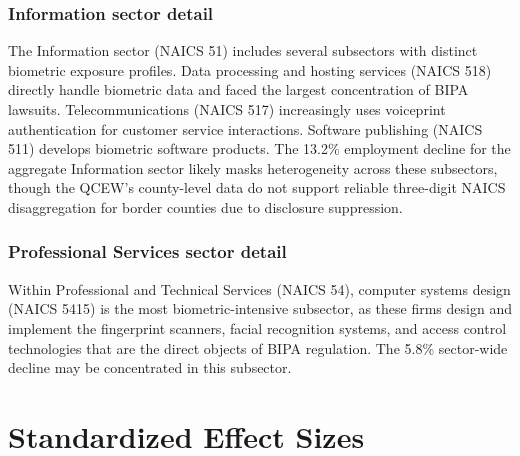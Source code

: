 \documentclass[12pt]{article}
\begin{document}
\subsubsection*{Information sector detail} The Information sector (NAICS 51) includes several subsectors with distinct biometric exposure profiles. Data processing and hosting services (NAICS 518) directly handle biometric data and faced the largest concentration of BIPA lawsuits. Telecommunications (NAICS 517) increasingly uses voiceprint authentication for customer service interactions. Software publishing (NAICS 511) develops biometric software products. The 13.2\% employment decline for the aggregate Information sector likely masks heterogeneity across these subsectors, though the QCEW's county-level data do not support reliable three-digit NAICS disaggregation for border counties due to disclosure suppression.

\subsubsection*{Professional Services sector detail} Within Professional and Technical Services (NAICS 54), computer systems design (NAICS 5415) is the most biometric-intensive subsector, as these firms design and implement the fingerprint scanners, facial recognition systems, and access control technologies that are the direct objects of BIPA regulation. The 5.8\% sector-wide decline may be concentrated in this subsector.


\section{Standardized Effect Sizes}
\label{sec:sde}


\end{document}

